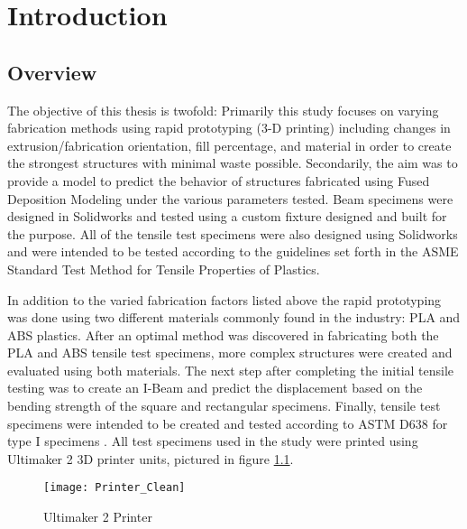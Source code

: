 \chapter{Introduction}
\section{Overview}
The objective of this thesis is twofold: Primarily this study focuses on varying fabrication methods using rapid prototyping (3-D printing) including changes in extrusion/fabrication orientation, fill percentage, and material in order to create the strongest structures with minimal waste possible. Secondarily, the aim was to provide a model to predict the behavior of structures fabricated using Fused Deposition Modeling under the various parameters tested. Beam specimens were designed in Solidworks and tested using a custom fixture designed and built for the purpose. All of the tensile test specimens were also designed using Solidworks and were intended to be tested according to the guidelines set forth in the ASME Standard Test Method for Tensile Properties of Plastics. \par
	In addition to the varied fabrication factors listed above the rapid prototyping was done using two different materials commonly found in the industry: PLA and ABS plastics. After an optimal method was discovered in fabricating both the PLA and ABS tensile test specimens, more complex structures were created and evaluated using both materials. The next step after completing the initial tensile testing was to create an I-Beam and predict the displacement based on the bending strength of the square and rectangular specimens. Finally, tensile test specimens were intended to be created and tested according to ASTM D638 for type I specimens \citep{ASTMNorma2004}. All test specimens used in the study were printed using Ultimaker 2 3D printer units, pictured in figure \ref{fig:Printer_Clean}.
	
	\begin{figure} [H]
		\centering
		\caption{Ultimaker 2 Printer}
		\texttt{[image: Printer\_Clean]}
		\label{fig:Printer_Clean}
	\end{figure}
	
